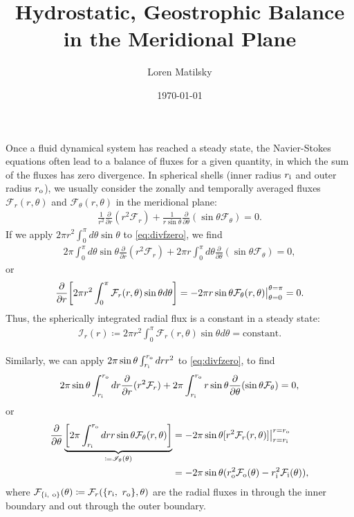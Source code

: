 \documentclass[12pt]{article} %
\date{\today}
\author{Loren Matilsky}
\title{Hydrostatic, Geostrophic Balance in the Meridional Plane}
\newcommand{\pderiv}[2]{\frac{\partial#1}{\partial#2}}
\newcommand{\f}{\mathcal{F}}
\newcommand{\ri}{r_{\rm{i}}}
\newcommand{\ro}{r_{\rm{o}}}
\begin{document}
	\maketitle
Once a fluid dynamical system has reached a steady state, the Navier-Stokes equations often lead to a balance of fluxes for a given quantity, in which the sum of the fluxes has zero divergence. In spherical shells (inner radius $\ri$ and outer radius $\ro$), we usually consider the zonally and temporally averaged fluxes $\f_r(r,\theta)$ and $\f_\theta(r,\theta)$ in the meridional plane:
\begin{align}
\frac{1}{r^2}\pderiv{}{r}(r^2\f_r) + \frac{1}{r\sin\theta}\pderiv{}{\theta}(\sin\theta\f_\theta) = 0. 
\label{eq:divfzero}
\end{align}
If we apply $2\pi r^2\int_0^\pi d\theta \sin\theta$ to \eqref{eq:divfzero}, we find
\begin{align*}
2\pi\int_0^\pi d\theta \sin\theta\pderiv{}{r}(r^2\f_r) + 2\pi r\int_0^\pi d\theta\pderiv{}{\theta}(\sin\theta\f_\theta) = 0,
\end{align*}
or 
\begin{align*}
\pderiv{}{r}\bigg{[}2\pi r^2\int_0^\pi\f_r(r,\theta)\sin\theta d \theta\bigg{]} = -2\pi r\sin\theta\f_\theta(r,\theta)\big{|}_{\theta=0}^{\theta=\pi} = 0.
\end{align*}
Thus, the spherically integrated radial flux is a constant in a steady state:
\begin{align}
\mathscr{I}_r(r) \coloneqq 2\pi r^2\int_0^\pi\f_r(r,\theta)\sin\theta d \theta = \text{constant}.
\label{eq:ir}
\end{align}

Similarly, we can apply $2\pi \sin\theta \int_{\ri}^{\ro} dr r^2$ to \eqref{eq:divfzero}, to find
\begin{align*}
2\pi\sin\theta\int_{\ri}^{\ro}dr\pderiv{}{r}(r^2\f_r) + 2\pi \int_{\ri}^{\ro}r\sin\theta\pderiv{}{\theta}(\sin\theta\f_\theta) = 0,
\end{align*}
or
\begin{align}
\pderiv{}{\theta}\underbrace{\bigg{[}2\pi\int_{\ri}^{\ro}dr  r\sin\theta\f_\theta(r,\theta)\bigg{]}}_{\coloneqq\mathscr{I}_\theta(\theta)} &= -2\pi\sin\theta [r^2\f_r(r,\theta)]\big{|}_{r=\ri}^{r=\ro}\nonumber\\
&= -2\pi\sin\theta(\ro^2\f_{\rm{o}}(\theta) - \ri^2\f_{\rm{i}}(\theta)),
\label{eq:dithdth}
\end{align}
where $\f_{\{\rm{i},\ \rm{o}\}}(\theta) \coloneqq \f_r(\{\ri,\ \ro\},\theta)$ are the radial fluxes in through the inner boundary and out through the outer boundary. 
\end{document}
